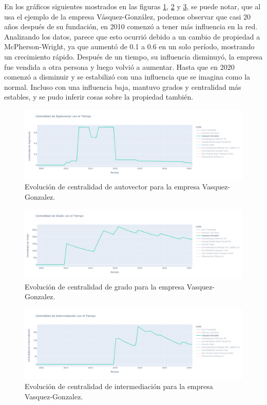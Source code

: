 \documentclass[11pt,spanish,a4paper]{article}
\begin{document}
En los gráficos siguientes mostrados en las figuras \ref{fig:cent_grado_a_VG}, \ref{fig:cent_grado_g_VG} y \ref{fig:cent_grado_i_VG}, se puede notar, que al usa el ejemplo de la empresa Vásquez-González, podemos observar que casi 20 años después de su fundación, en 2010 comenzó a tener más influencia en la red. Analizando los datos, parece que esto ocurrió debido a un cambio de propiedad a McPherson-Wright, ya que aumentó de 0.1 a 0.6 en un solo período, mostrando un crecimiento rápido. Después de un tiempo, su influencia disminuyó, la empresa fue vendida a otra persona y luego volvió a aumentar. Hasta que en 2020 comenzó a disminuir y se estabilizó con una influencia que se imagina como la normal. Incluso con una influencia baja, mantuvo grados y centralidad más estables, y se pudo inferir cosas sobre la propiedad también.

\begin{figure}[H]
  \centering
  \includegraphics[width=0.7\linewidth]{graphs/eigenvector_centralidad_tiempo_vasquez.png}
  \caption{Evolución de centralidad de autovector para la empresa Vasquez-Gonzalez.}
  \label{fig:cent_grado_a_VG}
\end{figure}

\begin{figure}[H]
  \centering
  \includegraphics[width=0.7\linewidth]{graphs/grado_centralidad_tiempo_vasquez.png}
  \caption{Evolución de centralidad de grado para la empresa Vasquez-Gonzalez.}
  \label{fig:cent_grado_g_VG}
\end{figure}

\begin{figure}[H]
  \centering
  \includegraphics[width=0.7\linewidth]{graphs/between_centralidad_tiempo_vasquez.png}
  \caption{Evolución de centralidad de intermediación para la empresa Vasquez-Gonzalez.}
  \label{fig:cent_grado_i_VG}
\end{figure}
\end{document}

